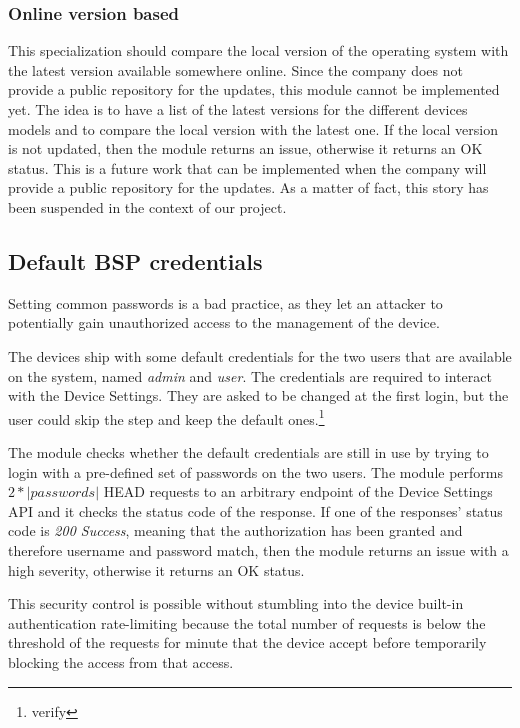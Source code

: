 \subsubsection{Online version based}

This specialization should compare the local version of the operating system with the latest version available somewhere online. Since the company does not provide a public repository for the updates, this module cannot be implemented yet. The idea is to have a list of the latest versions for the different devices models and to compare the local version with the latest one. If the local version is not updated, then the module returns an issue, otherwise it returns an OK status. This is a future work that can be implemented when the company will provide a public repository for the updates. As a matter of fact, this story has been suspended in the context of our project.

\subsection{Default BSP credentials}

Setting common passwords is a bad practice, as they let an attacker to potentially gain unauthorized access to the management of the device.

The devices ship with some default credentials for the two users that are available on the system, named \textit{admin} and \textit{user}. The credentials are required to interact with the Device Settings. They are asked to be changed at the first login, but the user could skip the step and keep the default ones.\footnote{verify}

The module checks whether the default credentials are still in use by trying to login with a pre-defined set of passwords on the two users. The module performs $2*|passwords|$ HEAD requests to an arbitrary endpoint of the Device Settings API and it checks the status code of the response. If one of the responses' status code is \textit{200 Success}, meaning that the authorization has been granted and therefore username and password match, then the module returns an issue with a high severity, otherwise it returns an OK status.

This security control is possible without stumbling into the device built-in authentication rate-limiting because the total number of requests is below the threshold of the requests for minute that the device accept before temporarily blocking the access from that access.

